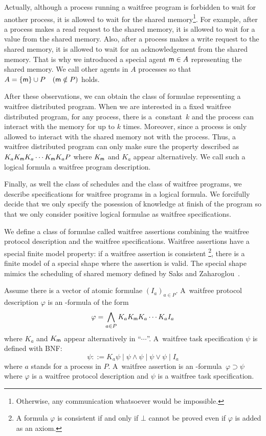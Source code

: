   Actually, although a process running a waitfree program is forbidden to wait for another process,
  it is allowed to wait for the shared memory\footnote{Otherwise, any communication
  whatsoever would be impossible.}.
  For example, after a process
  makes a read request to the shared memory,
  it is allowed to wait for a value from the shared memory.
  Also, after a process makes a write request to the shared memory,
  it is allowed to wait for an acknowledgement from the shared memory.
  That is why we introduced a special agent ${\sf m}\in A$ representing the shared memory.
  We call other agents in $A$ processes so that
  $A=\{{\sf m}\}\cup P\quad ({\sf m}\notin P)$ holds.

  After these observations, we can obtain the class of
  formulae representing a waitfree distributed program.
  When we are interested in a fixed waitfree distributed program,
  for any process, there is a~constant~$k$ and the process can interact with the memory for
  up to $k$ times.
  Moreover, since a process is only allowed to interact with the shared memory not with the
  process.
  Thus, a waitfree distributed program can only make sure the property described as
  $K_aK_{\sf m} K_a\cdots K_{\sf m} K_a P$ where $K_{\sf m}$ and $K_a$ appear
  alternatively.
  We call such a logical formula a waitfree program description.

  Finally, as well the class of schedules and the class of waitfree programs,
  we describe specifications for waitfree programs in a logical formula.
  We forcifully decide that we only specify the posession of knowledge at finish of the
  program so that we only consider positive logical formulae as waitfree specifications.

  We define a class of formulae called waitfree assertions combining the waitfree protocol
  description and the waitfree specifications.
  Waitfree assertions have a special finite model property:
  if a waitfree assertion is consistent%
  \footnote{A formula $\varphi$ is consistent if and only if $\bot$ cannot be proved even if
  $\varphi$ is added as an axiom.}, there is a finite model of a special shape
  where the assertion is valid.
  The special shape mimics the scheduling of shared memory
  defined by Saks and Zaharoglou~\cite{saks2000wait}.

  \begin{definition}
   Assume there is a vector of atomic formulae $(I_a)_{a\in P}$.
   A~waitfree protocol description $\varphi$ is an \iec-formula of the form
   \[
   \varphi = \bigwedge_{a\in P} K_a K_{\sf m} K_a \cdots K_a I_a
   \]
   where $K_a$ and $K_{\sf m}$ appear alternatively in ``$\cdots$''.
   A~waitfree task specification $\psi$ is defined with BNF:
   \[
   \psi ::= K_a\psi\mid \psi\land\psi\mid \psi\vee\psi\mid I_a
   \]
   where $a$ stands for a process in $P$.
   A~waitfree assertion is an \iec-formula~$\varphi\supset\psi$ where $\varphi$ is a
   waitfree protocol description and $\psi$ is a waitfree task specification.
  \end{definition}

